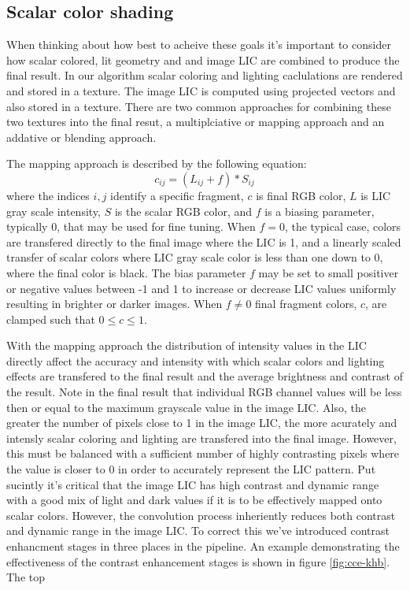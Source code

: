 \documentclass[a4paper,10pt]{article}
\begin{document}
\subsection{Scalar color shading}
When thinking about how best to acheive these goals it's important to consider how scalar colored, lit geometry and and image LIC are combined to produce the final result. In our algorithm scalar coloring and lighting caclulations are rendered and stored in a texture. The image LIC is computed using projected vectors and also stored in a texture. There are two common approaches for combining these two textures into the final resut, a multiplciative or mapping approach\cite{image-lic} and an addative or blending approach\cite{surface lic}.

The mapping approach is described by the following equation:
\begin{equation}
c_{ij} = ( L_{ij} + f ) * S_{ij}
\label{eqn:color-map}
\end{equation}
where the indices $i,j$ identify a specific fragment, $c$ is final RGB color, $L$ is LIC gray scale intensity, $S$ is the scalar RGB color, and $f$ is a biasing parameter, typically 0, that may be used for fine tuning. When $f=0$, the typical case, colors are transfered directly to the final image where the LIC is 1, and a linearly scaled transfer of scalar colors where LIC gray scale color is less than one down to 0, where the final color is black. The bias parameter $f$ may be set to small positiver or negative values between -1 and 1 to increase or decrease LIC values uniformly resulting in brighter or darker images. When $f\neq0$ final fragment colors, $c$, are clamped such that $0 \leq c \leq 1$.

With the mapping approach the distribution of intensity values in the LIC directly affect the accuracy and intensity with which scalar colors and lighting effects are transfered to the final result and the average brightness and contrast of the result. Note in the final result that individual RGB channel values will be less then or equal to the maximum grayscale value in the image LIC. Also, the greater the number of pixels close to 1 in the image LIC, the more acurately and intensly scalar coloring and lighting are transfered into the final image. However, this must be balanced with a sufficient number of highly contrasting pixels where the value is closer to 0 in order to accurately represent the LIC pattern. Put sucintly it's critical that the image LIC has high contrast and dynamic range with a good mix of light and dark values if it is to be effectively mapped onto scalar colors. However, the convolution process inheriently reduces both contrast and dynamic range in the image LIC. To correct this we've introduced contrast enhancment stages in three places in the pipeline. An example demonstrating the effectiveness of the contrast enhancement stages is shown in figure \ref{fig:cce-khb}. The top
\end{document}
